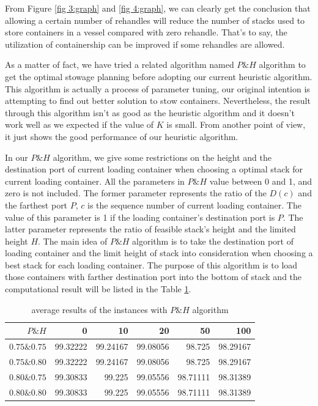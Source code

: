 \documentclass[review,3p,times,authoryear,12pt]{elsarticle}
\begin{document}
From Figure \ref{fig 3:graph} and \ref{fig 4:graph}, we can clearly get the conclusion that allowing a certain number of rehandles will reduce the number of stacks used to store containers in a vessel compared with zero rehandle.
That's to say, the utilization of containership can be improved if some rehandles are allowed.

As a matter of fact, we have tried a related algorithm named $P\&H$ algorithm to get the optimal stowage planning before adopting our current heuristic algorithm.
This algorithm is actually a process of parameter tuning, our original intention is attempting to find out better solution to stow containers.
Nevertheless, the result through this algorithm isn't as good as the heuristic algorithm and it doesn't work well as we expected if the value of $K$ is small.
From another point of view, it just shows the good performance of our heuristic algorithm.

In our $P\&H$ algorithm, we give some restrictions on the height and the destination port of current loading container when choosing a  optimal stack for current loading container.
All the parameters in $P\&H$ value between 0 and 1, and zero is not included.
The former parameter represents the ratio of the $D(c)$ and the farthest port $P$, $c$ is the sequence number of current loading container.
The value of this parameter is 1 if the loading container's destination port is $P$.
The latter parameter represents the ratio of feasible stack's height and the limited height $H$.
The main idea of $P\&H$ algorithm is to take the destination port of loading container and the limit height of stack into consideration when choosing a best stack for each loading container.
The purpose of this algorithm is to load those containers with farther destination port into the bottom of stack and the computational result will be listed in the Table \ref{tab:5}.

\begin{table}[htbp]
  \centering
  \setlength{\belowcaptionskip}{10pt}
  \caption{average results of the instances with $P\&H$ algorithm}
    \begin{tabular}{r|r|r|r|r|r}
    \hline
     $P\&H$       &0   &10  &20  &50  &100\\
    \hline
    $0.75\&0.75$   &99.32222  &99.24167  &99.08056   &98.725  &98.29167\\
    \hline
    $0.75\&0.80$   &99.32222  &99.24167  &99.08056   &98.725  &98.29167\\
    \hline
    $0.80\&0.75$   &99.30833  &99.225  &99.05556   &98.71111  &98.31389\\
    \hline
    $0.80\&0.80$    &99.30833  &99.225  &99.05556   &98.71111  &98.31389\\
    \hline
    \end{tabular}
  \label{tab:5}
\end{table}
\end{document}
